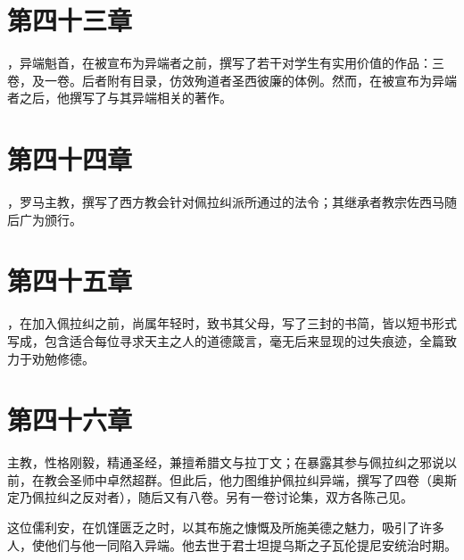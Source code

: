 \section{第四十三章}

，异端魁首，在被宣布为异端者之前，撰写了若干对学生有实用价值的作品：三卷，及一卷。后者附有目录，仿效殉道者圣西彼廉的体例。然而，在被宣布为异端者之后，他撰写了与其异端相关的著作。\par


\section{第四十四章}

，罗马主教，撰写了西方教会针对佩拉纠派所通过的法令；其继承者教宗佐西马随后广为颁行。\par


\section{第四十五章}

，在加入佩拉纠之前，尚属年轻时，致书其父母，写了三封的书简，皆以短书形式写成，包含适合每位寻求天主之人的道德箴言，毫无后来显现的过失痕迹，全篇致力于劝勉修德。\par


\section{第四十六章}

主教，性格刚毅，精通圣经，兼擅希腊文与拉丁文；在暴露其参与佩拉纠之邪说以前，在教会圣师中卓然超群。但此后，他力图维护佩拉纠异端，撰写了四卷（奥斯定乃佩拉纠之反对者），随后又有八卷。另有一卷讨论集，双方各陈己见。\par

这位儒利安，在饥馑匮乏之时，以其布施之慷慨及所施美德之魅力，吸引了许多人，使他们与他一同陷入异端。他去世于君士坦提乌斯之子瓦伦提尼安统治时期。\par

